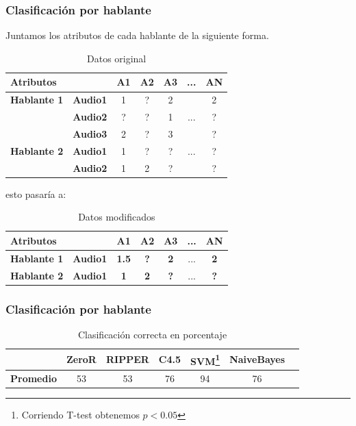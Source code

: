 \documentclass[mathserif]{beamer}%
\begin{document}
\begin{frame}
	\frametitle{Clasificación por hablante}
	
	Juntamos los atributos de cada hablante de la siguiente forma.
	
	\begin{table}[H]
		\centering
		\resizebox{7cm}{!} {
		\begin{tabular}{|l|l|ccccc|}
			\hline
			\multicolumn{2}{|l|}{Atributos} & A1 & A2 & A3 & ... & AN \\
			\hline 
			\textbf{Hablante 1} & \textbf{Audio1} & 1 & ? & 2 & & 2\\
			& \textbf{Audio2} & ? & ? & 1 & ... & ? \\
			& \textbf{Audio3} & 2 & ? & 3 & & ? \\
			\hline
			\textbf{Hablante 2} & \textbf{Audio1} & 1 & ? & ? & ... & ? \\
			& \textbf{Audio2} & 1 & 2 & ? & & ? \\
			\hline
		\end{tabular}
		}
		\caption{Datos original}
		\label{}
	\end{table}
	
	esto pasaría a:
	
	\begin{table}[H]
		\centering
		\resizebox{7cm}{!} {
		\begin{tabular}{|l|l|ccccc|}
			\hline
			\multicolumn{2}{|l|}{Atributos} & A1 & A2 & A3 & ... & AN \\
			\hline 
			\textbf{Hablante 1} & \textbf{Audio1} & \textbf{1.5} & \textbf{?} & \textbf{2} & ... & \textbf{2}\\
			\hline
			\textbf{Hablante 2} & \textbf{Audio1} & \textbf{1} & \textbf{2} & \textbf{?} & ... & \textbf{?} \\
			\hline
		\end{tabular}
		}
		\caption{Datos modificados}
		\label{}
	\end{table}
\end{frame}

\begin{frame}
	\frametitle{Clasificación por hablante}
%	
%	
%	
	\begin{table}[H]
		\centering
		\begin{tabular}{|l|c|c|c|c|c|c|}
			\hline
			\textbf{}  & \textbf{ZeroR} & \textbf{RIPPER} & \textbf{C4.5} & \textbf{SVM}\footnote{Corriendo T-test obtenemos $p < 0.05$} & \textbf{NaiveBayes} \\ \hline
			\textbf{Promedio} & 53 & 53 & 76 & 94 & 76  \\ 
			\hline
		\end{tabular}
		\caption{Clasificación correcta en porcentaje}
		\label{class_corr_en_pct}
	\end{table}
	
\end{frame}
\end{document}
